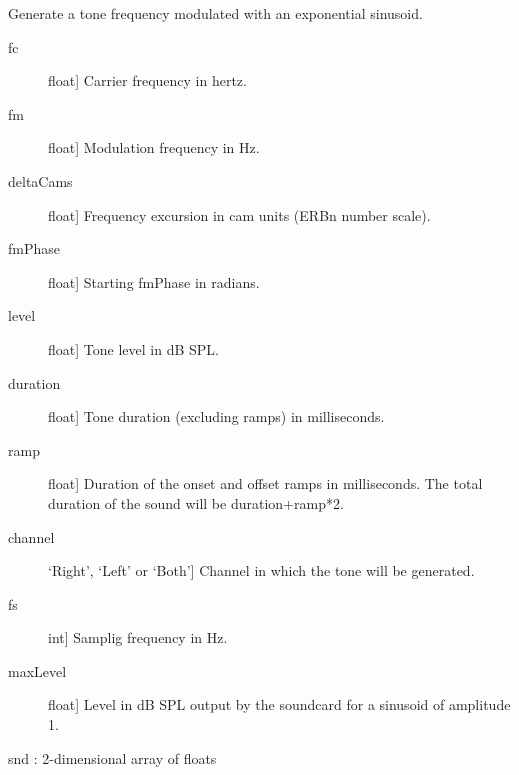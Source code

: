 \documentclass[letterpaper,10pt,english]{sphinxmanual}
\begin{document}
\begin{fulllineitems}
\end{fulllineitems}


\begin{fulllineitems}
\label{index:sndlib.camSinFMTone}
Generate a tone frequency modulated with an exponential sinusoid.
\begin{description}
\item[{fc}] \leavevmode{[}float{]}
Carrier frequency in hertz.

\item[{fm}] \leavevmode{[}float{]}
Modulation frequency in Hz.

\item[{deltaCams}] \leavevmode{[}float{]}
Frequency excursion in cam units (ERBn number scale).

\item[{fmPhase}] \leavevmode{[}float{]}
Starting fmPhase in radians.

\item[{level}] \leavevmode{[}float{]}
Tone level in dB SPL.

\item[{duration}] \leavevmode{[}float{]}
Tone duration (excluding ramps) in milliseconds.

\item[{ramp}] \leavevmode{[}float{]}
Duration of the onset and offset ramps in milliseconds.
The total duration of the sound will be duration+ramp*2.

\item[{channel}] \leavevmode{[}`Right', `Left' or `Both'{]}
Channel in which the tone will be generated.

\item[{fs}] \leavevmode{[}int{]}
Samplig frequency in Hz.

\item[{maxLevel}] \leavevmode{[}float{]}
Level in dB SPL output by the soundcard for a sinusoid of
amplitude 1.

\end{description}

snd : 2-dimensional array of floats


\end{fulllineitems}
\end{document}
